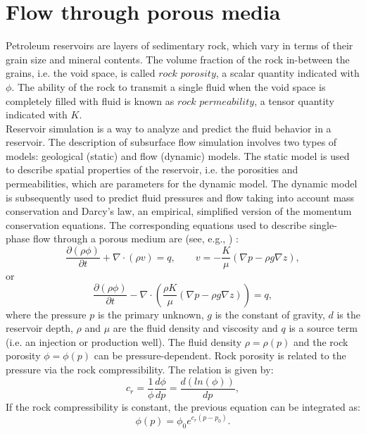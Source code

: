\documentclass[12pt]{article}
\begin{document}
 \section{Flow through porous media}\label{fpm}
Petroleum reservoirs are layers of sedimentary rock, which vary in terms of their grain size and mineral contents. The volume fraction of the rock in-between the grains, i.e. the void space, is called $rock$
$porosity$, a scalar quantity indicated with $\phi$.
The ability of the rock to transmit a single fluid when the void space is completely filled with fluid
is known as $rock$ $permeability$, a tensor quantity indicated with ${K}$. \\
Reservoir simulation is a way to analyze and predict the fluid behavior in a reservoir. The description of subsurface flow simulation involves two types of models: geological (static) and flow (dynamic) models. The static model is used to describe spatial properties of the reservoir, i.e. the porosities and permeabilities, which are parameters for the dynamic model. 
The dynamic model is subsequently used to predict fluid pressures and flow taking into account mass conservation and Darcy's law, an empirical, simplified version of the momentum conservation equations. The corresponding equations used to describe single-phase flow through a porous medium are (see, e.g., \cite{Aziz79,Chen06,Jansen13})  :
\begin{equation}\label{eq:ce}
\frac{\partial (\rho \phi)}{\partial t}+ \nabla \cdot ( \rho {v})=q, \qquad v=-\frac{K}{\mu}(\nabla p-\rho g\nabla z),
\end{equation}
or
\begin{equation}\label{eq:ce1}
\frac{\partial (\rho \phi)}{\partial t}- \nabla \cdot \left( \frac{\rho{K}}{\mu}(\nabla {p}-\rho g\nabla z)\right)=q,
\end{equation}
where the pressure $p$ is the primary unknown, $g$ is the constant of gravity, $d$ is the reservoir depth,
$\rho$ and $\mu$ are the fluid density and viscosity and $q$ is a source term (i.e. an injection or production well). The fluid density $\rho=\rho(p)$ and the rock porosity $\phi=\phi(p)$ can be pressure-dependent.
Rock porosity is related to the pressure via the rock compressibility. The relation is given by:
\begin{equation*}
 c_r=\frac{1}{\phi}\frac{d\phi}{dp}=\frac{d(ln(\phi))}{dp},
\end{equation*}
If the rock compressibility is constant, the previous equation can be integrated as:
\begin{equation}\label{eq:por}
 \phi(p)=\phi_0 e^{c_r(p-p_0)}.
\end{equation}
\end{document}
